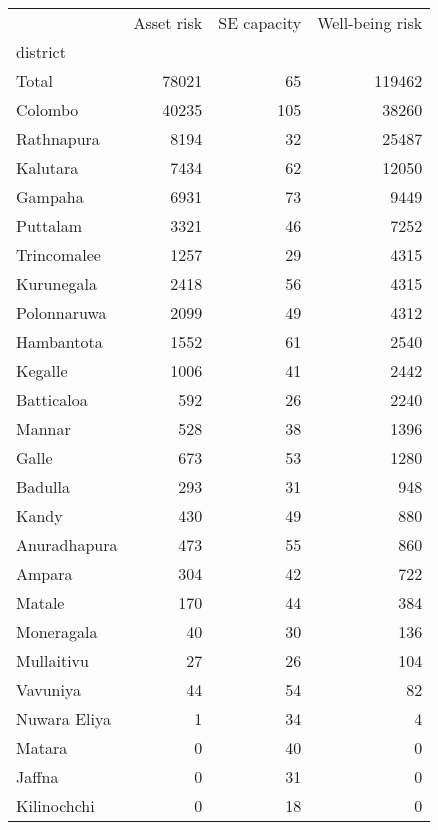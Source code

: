 \begin{tabular}{lrrr}
\toprule
{} &  Asset risk &  SE capacity &  Well-being risk \\
district     &             &              &                  \\
\midrule
Total        &       78021 &           65 &           119462 \\
Colombo      &       40235 &          105 &            38260 \\
Rathnapura   &        8194 &           32 &            25487 \\
Kalutara     &        7434 &           62 &            12050 \\
Gampaha      &        6931 &           73 &             9449 \\
Puttalam     &        3321 &           46 &             7252 \\
Trincomalee  &        1257 &           29 &             4315 \\
Kurunegala   &        2418 &           56 &             4315 \\
Polonnaruwa  &        2099 &           49 &             4312 \\
Hambantota   &        1552 &           61 &             2540 \\
Kegalle      &        1006 &           41 &             2442 \\
Batticaloa   &         592 &           26 &             2240 \\
Mannar       &         528 &           38 &             1396 \\
Galle        &         673 &           53 &             1280 \\
Badulla      &         293 &           31 &              948 \\
Kandy        &         430 &           49 &              880 \\
Anuradhapura &         473 &           55 &              860 \\
Ampara       &         304 &           42 &              722 \\
Matale       &         170 &           44 &              384 \\
Moneragala   &          40 &           30 &              136 \\
Mullaitivu   &          27 &           26 &              104 \\
Vavuniya     &          44 &           54 &               82 \\
Nuwara Eliya &           1 &           34 &                4 \\
Matara       &           0 &           40 &                0 \\
Jaffna       &           0 &           31 &                0 \\
Kilinochchi  &           0 &           18 &                0 \\
\bottomrule
\end{tabular}
